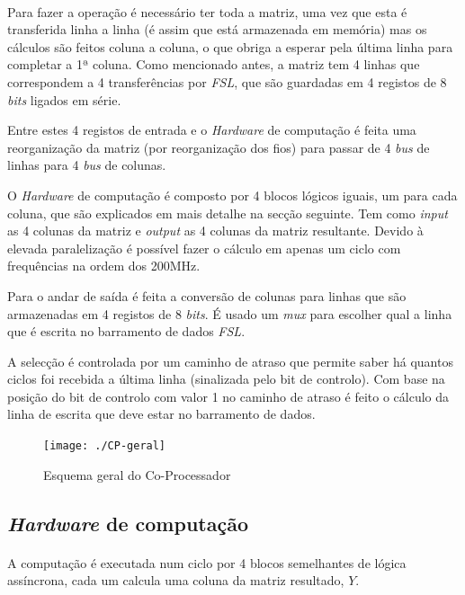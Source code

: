 \paragraph{} Para fazer a operação é necessário ter toda a matriz, uma vez que esta é transferida linha a linha (é assim que está armazenada em memória) mas os cálculos são feitos coluna a coluna, o que obriga a esperar pela última linha para completar a 1ª coluna. Como mencionado antes, a matriz tem 4 linhas que correspondem a 4 transferências por \textit{FSL}, que são guardadas em 4 registos de 8 \textit{bits} ligados em série.

Entre estes 4 registos de entrada e o \textit{Hardware} de computação é feita uma reorganização da matriz (por reorganização dos fios) para passar de 4 \textit{bus} de linhas para 4 \textit{bus} de colunas.

O \textit{Hardware} de computação é composto por 4 blocos lógicos iguais, um para cada coluna, que são explicados em mais detalhe na secção seguinte. Tem como \textit{input} as 4 colunas da matriz e \textit{output} as 4 colunas da matriz resultante. Devido à elevada paralelização é possível fazer o cálculo em apenas um ciclo com frequências na ordem dos 200MHz.

Para o andar de saída é feita a conversão de colunas para linhas que são armazenadas em 4 registos de 8 \textit{bits}. É usado um \textit{mux} para escolher qual a linha que é escrita no barramento de dados \textit{FSL}. 

A selecção é controlada por um caminho de atraso que permite saber há quantos ciclos foi recebida a última linha (sinalizada pelo bit de controlo). Com base na posição do bit de controlo com valor 1 no caminho de atraso é feito o cálculo da linha de escrita que deve estar no barramento de dados.

\begin{figure}[H]
    \centering
    \texttt{[image: ./CP-geral]}~\\[1cm]
    \caption{Esquema geral do Co-Processador}
    \label{fig:CP-G}
\end{figure}

\subsection{\textit{Hardware} de computação}
\paragraph{} A computação é executada num ciclo por 4 blocos semelhantes de lógica assíncrona, cada um calcula uma coluna da matriz resultado, $Y$. 

